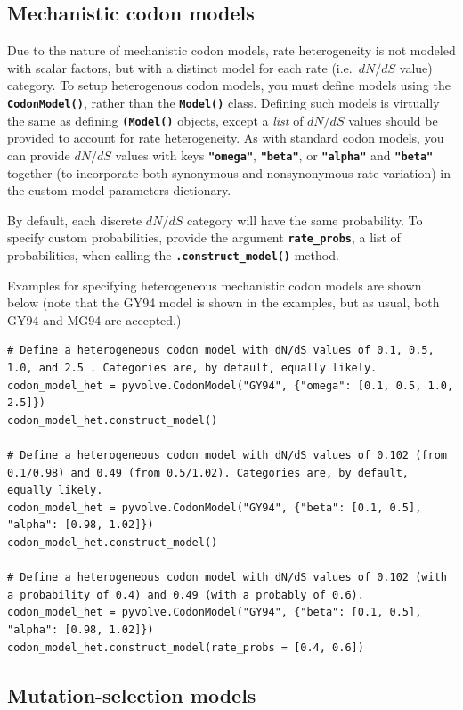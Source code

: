 \documentclass{article}
\newcommand{\code}[1]{\textbf{\texttt{\small{#1}}}}
\begin{document}
 
\subsection{Mechanistic codon models}

Due to the nature of mechanistic codon models, rate heterogeneity is not modeled with scalar factors, but with a distinct model for each rate (i.e.\, $dN/dS$ value) category. To setup heterogenous codon models, you must define models using the \code{CodonModel()}, rather than the \code{Model()} class. Defining such models is virtually the same as defining \code{(Model()} objects, except a \emph{list} of $dN/dS$ values should be provided to account for rate heterogeneity. As with standard codon models, you can provide $dN/dS$ values with keys \code{"omega"}, \code{"beta"}, or \code{"alpha"} and \code{"beta"} together (to incorporate both synonymous and nonsynonymous rate variation) in the custom model parameters dictionary.

By default, each discrete $dN/dS$ category will have the same probability. To specify custom probabilities, provide the argument \code{rate\_probs}, a list of probabilities, when calling the \code{.construct\_model()} method.

Examples for specifying heterogeneous mechanistic codon models are shown below (note that the GY94 model is shown in the examples, but as usual, both GY94 and MG94 are accepted.)
\begin{lstlisting}
# Define a heterogeneous codon model with dN/dS values of 0.1, 0.5, 1.0, and 2.5 . Categories are, by default, equally likely.
codon_model_het = pyvolve.CodonModel("GY94", {"omega": [0.1, 0.5, 1.0, 2.5]})
codon_model_het.construct_model()

# Define a heterogeneous codon model with dN/dS values of 0.102 (from 0.1/0.98) and 0.49 (from 0.5/1.02). Categories are, by default, equally likely.
codon_model_het = pyvolve.CodonModel("GY94", {"beta": [0.1, 0.5], "alpha": [0.98, 1.02]})
codon_model_het.construct_model()

# Define a heterogeneous codon model with dN/dS values of 0.102 (with a probability of 0.4) and 0.49 (with a probably of 0.6).
codon_model_het = pyvolve.CodonModel("GY94", {"beta": [0.1, 0.5], "alpha": [0.98, 1.02]})
codon_model_het.construct_model(rate_probs = [0.4, 0.6])
\end{lstlisting}


\subsection{Mutation-selection models}
\end{document}
